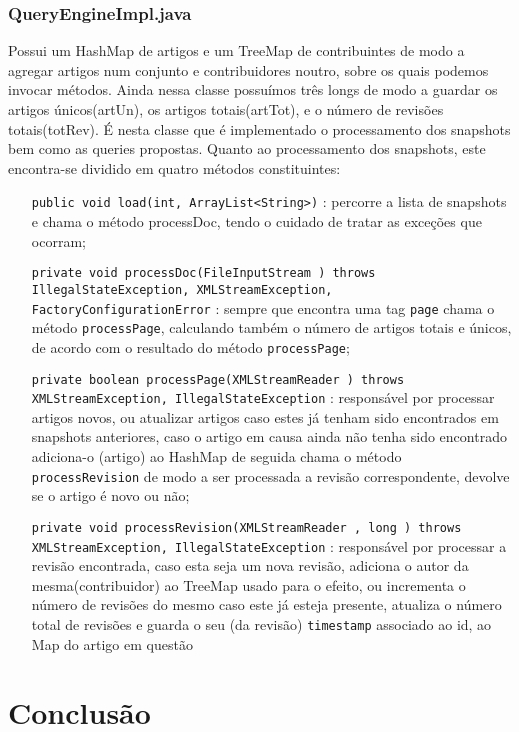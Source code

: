 \documentclass[a4paper,11pt]{article}
\begin{document}
\subsubsection{QueryEngineImpl.java}
Possui um HashMap de artigos e um TreeMap de contribuintes de modo a agregar artigos num conjunto e contribuidores noutro, sobre os quais podemos invocar métodos. Ainda nessa classe possuímos três longs de modo a guardar os artigos únicos(artUn), os artigos totais(artTot), e o número de revisões totais(totRev). É nesta classe que é implementado o processamento dos snapshots bem como as queries propostas. Quanto ao processamento dos snapshots, este encontra-se dividido em quatro métodos constituintes:
\begin{itemize}[align=left]
\item[\texttt{public void load(int, ArrayList<String>)}] : percorre a lista de snapshots e chama o método processDoc, tendo o cuidado de tratar as exceções que ocorram;
\item[\texttt{private void processDoc(FileInputStream ) throws IllegalStateException, XMLStreamException, FactoryConfigurationError}] : sempre que encontra uma tag \texttt{page} chama o método \texttt{processPage}, calculando também o número de artigos totais e únicos, de acordo com o resultado do método \texttt{processPage};
\item[\texttt{private boolean processPage(XMLStreamReader ) throws XMLStreamException, IllegalStateException}]: responsável por processar artigos novos, ou atualizar artigos caso estes já tenham sido encontrados em snapshots anteriores, caso o artigo em causa ainda não tenha sido encontrado adiciona-o (artigo) ao HashMap de seguida chama o método \texttt{processRevision} de modo a ser processada a revisão correspondente, devolve se o artigo é novo ou não;
\item[\texttt{private void processRevision(XMLStreamReader , long ) throws XMLStreamException, IllegalStateException}]: responsável por processar a revisão encontrada, caso esta seja um nova revisão, adiciona o autor da mesma(contribuidor) ao TreeMap usado para o efeito, ou incrementa o número de revisões do mesmo caso este já esteja presente, atualiza o número total de revisões e guarda o seu (da revisão) \texttt{timestamp} associado ao id, ao Map do artigo em questão
\end{itemize}

\newpage

\section{Conclusão}
\end{document}
